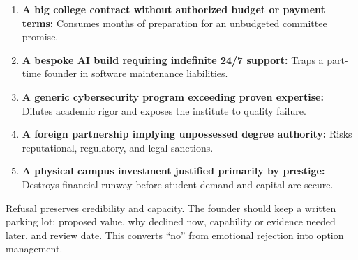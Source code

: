 \begin{enumerate}
    \item \textbf{A big college contract without authorized budget or payment terms:} Consumes months of preparation for an unbudgeted committee promise.
    \item \textbf{A bespoke AI build requiring indefinite 24/7 support:} Traps a part-time founder in software maintenance liabilities.
    \item \textbf{A generic cybersecurity program exceeding proven expertise:} Dilutes academic rigor and exposes the institute to quality failure.
    \item \textbf{A foreign partnership implying unpossessed degree authority:} Risks reputational, regulatory, and legal sanctions.
    \item \textbf{A physical campus investment justified primarily by prestige:} Destroys financial runway before student demand and capital are secure.
\end{enumerate}

Refusal preserves credibility and capacity. The founder should keep a written parking lot: proposed value, why declined now, capability or evidence needed later, and review date. This converts ``no'' from emotional rejection into option management.
